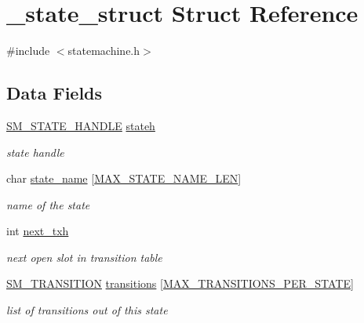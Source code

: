 \hypertarget{struct__state__struct}{\section{\-\_\-state\-\_\-struct Struct Reference}
\label{struct__state__struct}
}


{\ttfamily \#include $<$statemachine.\-h$>$}

\subsection*{Data Fields}
\begin{DoxyCompactItemize}
\item 
\hyperlink{statemachine_8h_aa30fadf137d8a09eceea2a2d973be5ef}{S\-M\-\_\-\-S\-T\-A\-T\-E\-\_\-\-H\-A\-N\-D\-L\-E} \hyperlink{struct__state__struct_afb6173932f6475f5e42df883a40946ea}{stateh}
\begin{DoxyCompactList}\small\item\em state handle \end{DoxyCompactList}\item 
char \hyperlink{struct__state__struct_a6ef692bc2cb17ff774b80d244d265e2a}{state\-\_\-name} \mbox{[}\hyperlink{statemachine_8h_ae872a1a06e4e888564a80e53455e196d}{M\-A\-X\-\_\-\-S\-T\-A\-T\-E\-\_\-\-N\-A\-M\-E\-\_\-\-L\-E\-N}\mbox{]}
\begin{DoxyCompactList}\small\item\em name of the state \end{DoxyCompactList}\item 
int \hyperlink{struct__state__struct_a597bbb4fe7a8da9e9c9b9a7bc000df14}{next\-\_\-txh}
\begin{DoxyCompactList}\small\item\em next open slot in transition table \end{DoxyCompactList}\item 
\hyperlink{statemachine_8h_a1148e8db5dedf7eff4c2d63a4a96dcee}{S\-M\-\_\-\-T\-R\-A\-N\-S\-I\-T\-I\-O\-N} \hyperlink{struct__state__struct_a25a7e5dd77b0d5c38ccdcc33de2302fd}{transitions} \mbox{[}\hyperlink{statemachine_8h_a3da5c19fbd596b2aa9e71f25ab3255ef}{M\-A\-X\-\_\-\-T\-R\-A\-N\-S\-I\-T\-I\-O\-N\-S\-\_\-\-P\-E\-R\-\_\-\-S\-T\-A\-T\-E}\mbox{]}
\begin{DoxyCompactList}\small\item\em list of transitions out of this state \end{DoxyCompactList}\end{DoxyCompactItemize}


